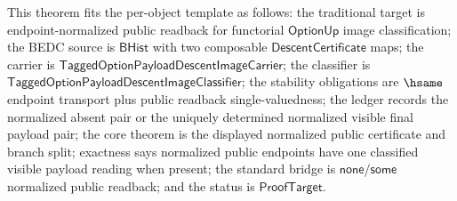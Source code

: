 \begin{theorem}
\label{thm:tagged-option-composite-image-classifier-normalized-public-readback-single-valuedness}
This theorem fits the per-object template as follows: the traditional target is
endpoint-normalized public readback for functorial $\mathsf{OptionUp}$ image
classification; the BEDC source is $\mathsf{BHist}$ with two composable
$\mathsf{DescentCertificate}$ maps; the carrier is
$\mathsf{TaggedOptionPayloadDescentImageCarrier}$; the classifier is
$\mathsf{TaggedOptionPayloadDescentImageClassifier}$; the stability obligations
are $\hsame$ endpoint transport plus public readback single-valuedness; the
ledger records the normalized absent pair or the uniquely determined normalized
visible final payload pair; the core theorem is the displayed normalized public
certificate and branch split; exactness says normalized public endpoints have
one classified visible payload reading when present; the standard bridge is
$\mathsf{none}$/$\mathsf{some}$ normalized public readback; and the status is
$\mathsf{ProofTarget}$.


\end{theorem}
